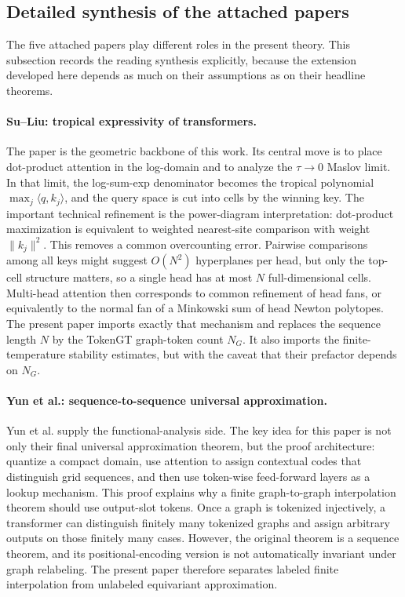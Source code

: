 \documentclass[11pt]{article}
\begin{document}
\subsection{Detailed synthesis of the attached papers}
\label{subsec:attached-synthesis}

The five attached papers play different roles in the present theory.  This subsection records the reading synthesis explicitly, because the extension developed here depends as much on their assumptions as on their headline theorems.

\paragraph{Su--Liu: tropical expressivity of transformers.}
The paper \cite{su2026tropicalexpressivity} is the geometric backbone of this work.  Its central move is to place dot-product attention in the log-domain and to analyze the $\tau\to 0$ Maslov limit.  In that limit, the log-sum-exp denominator becomes the tropical polynomial $\max_j\langle q,k_j\rangle$, and the query space is cut into cells by the winning key.  The important technical refinement is the power-diagram interpretation: dot-product maximization is equivalent to weighted nearest-site comparison with weight $\|k_j\|^2$.  This removes a common overcounting error.  Pairwise comparisons among all keys might suggest $O(N^2)$ hyperplanes per head, but only the top-cell structure matters, so a single head has at most $N$ full-dimensional cells.  Multi-head attention then corresponds to common refinement of head fans, or equivalently to the normal fan of a Minkowski sum of head Newton polytopes.  The present paper imports exactly that mechanism and replaces the sequence length $N$ by the TokenGT graph-token count $N_G$.  It also imports the finite-temperature stability estimates, but with the caveat that their prefactor depends on $N_G$.

\paragraph{Yun et al.: sequence-to-sequence universal approximation.}
Yun et al. \cite{yun2020universal} supply the functional-analysis side.  The key idea for this paper is not only their final universal approximation theorem, but the proof architecture: quantize a compact domain, use attention to assign contextual codes that distinguish grid sequences, and then use token-wise feed-forward layers as a lookup mechanism.  This proof explains why a finite graph-to-graph interpolation theorem should use output-slot tokens.  Once a graph is tokenized injectively, a transformer can distinguish finitely many tokenized graphs and assign arbitrary outputs on those finitely many cases.  However, the original theorem is a sequence theorem, and its positional-encoding version is not automatically invariant under graph relabeling.  The present paper therefore separates labeled finite interpolation from unlabeled equivariant approximation.
\end{document}
